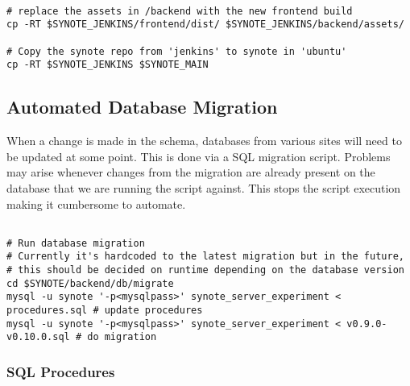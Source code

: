 \begin{listing}[H]
\begin{verbatim}

# replace the assets in /backend with the new frontend build
cp -RT $SYNOTE_JENKINS/frontend/dist/ $SYNOTE_JENKINS/backend/assets/

# Copy the synote repo from 'jenkins' to synote in 'ubuntu'
cp -RT $SYNOTE_JENKINS $SYNOTE_MAIN

\end{verbatim}
\label{lst:replace current deployment source}
\end{listing}

\subsection{Automated Database Migration}
\label{subsec:automated-database-migration}

When a change is made in the schema, databases from various sites will need to be updated at some point. This is done via a SQL migration script. Problems may arise whenever changes from the migration are already present on the database that we are running the script against. This stops the script execution making it cumbersome to automate.

\begin{listing}[H]
\begin{verbatim}

# Run database migration
# Currently it's hardcoded to the latest migration but in the future,
# this should be decided on runtime depending on the database version
cd $SYNOTE/backend/db/migrate
mysql -u synote '-p<mysqlpass>' synote_server_experiment < procedures.sql # update procedures
mysql -u synote '-p<mysqlpass>' synote_server_experiment < v0.9.0-v0.10.0.sql # do migration

\end{verbatim}
\label{lst:automated-db-migration}
\end{listing}

\subsubsection{SQL Procedures}
\label{subsubsec:sql-procedures}

